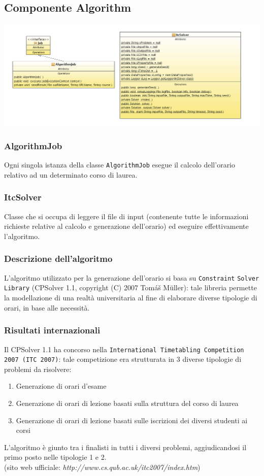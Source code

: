 \documentclass[11pt,a4paper]{article}
\begin{document}
\subsection{Componente Algorithm}
\includegraphics[scale=0.34]{images/MMalg_diagram_class.png}
\subsubsection{AlgorithmJob}
Ogni singola istanza della classe \verb|AlgorithmJob| esegue il calcolo dell'orario relativo ad un determinato corso di laurea.
\subsubsection{ItcSolver}
Classe che si occupa di leggere il file di input (contenente tutte le informazioni richieste relative al calcolo e generazione dell'orario) ed eseguire effettivamente l'algoritmo.
\subsubsection{Descrizione dell'algoritmo}
L'algoritmo utilizzato per la generazione dell'orario si basa su \verb|Constraint| \verb|Solver Library| (CPSolver 1.1,  copyright (C) 2007 Tomáš Müller): tale libreria permette la modellazione di una realtà universitaria al fine di elaborare diverse tipologie di orari, in base alle necessità.
\subsubsection*{Risultati internazionali}
Il CPSolver 1.1 ha concorso nella \verb|International Timetabling Competition| \verb|2007 (ITC 2007)|: tale competizione era strutturata in 3 diverse tipologie di problemi da risolvere:
\begin{enumerate}
 \item Generazione di orari d'esame
 \item Generazione di orari di lezione basati sulla struttura del corso di laurea
 \item Generazione di orari di lezione basati sulle iscrizioni dei diversi studenti ai corsi
\end{enumerate}
L'algoritmo è giunto tra i finalisti in tutti i diversi problemi, aggiudicandosi il primo posto nelle tipologie 1 e 2.
\\
(sito web ufficiale: \textit{http://www.cs.qub.ac.uk/itc2007/index.htm})
\end{document}
